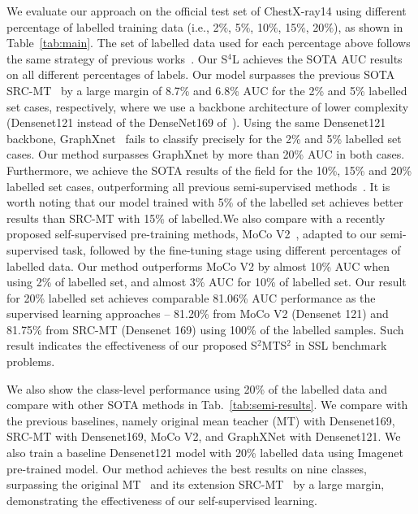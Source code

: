 \documentclass[runningheads]{llncs}
\begin{document}
We evaluate our approach on the official test set of ChestX-ray14
using different percentage of labelled training data (i.e., 2$\%$, 5$\%$, 10$\%$, 15$\%$, 20$\%$), as shown in Table~\ref{tab:main}. The set of labelled data used for each percentage above follows the same strategy of previous works~\cite{aviles2019graphx,liu2020semi}. 
Our S$^4$L achieves the SOTA AUC results on all different percentages of labels. 
Our model surpasses the previous SOTA SRC-MT~\cite{liu2020semi} by a large margin of 8.7\% and 6.8\% AUC  
for the 2\% and 5\% labelled set cases, respectively, where we use a backbone architecture of lower complexity (Densenet121 instead of the DenseNet169 of~\cite{liu2020semi}). Using the same Densenet121 backbone, GraphXnet~\cite{aviles2019graphx} fails to  classify precisely for the 2\% and 5\% labelled set cases. 
Our method surpasses GraphXnet by more than 20\% AUC in both cases. 
Furthermore, we achieve the SOTA results of the field for the 10\%, 15\% and 20\% labelled set cases, outperforming all previous semi-supervised methods~\cite{liu2020semi,aviles2019graphx}. It is worth noting that our model trained with 5\% of the labelled set achieves better results than SRC-MT with 15\% of labelled.We also compare with a recently proposed self-supervised pre-training methods, MoCo V2~\cite{chen2020improved}, adapted to our semi-supervised task,  followed by the fine-tuning stage using different percentages of labelled data.
Our method outperforms MoCo V2 by almost 10\% AUC when using 2\% of labelled set, and almost 3\% AUC for 10\% of labelled set. 
Our result for 20\% labelled set achieves comparable 81.06\% AUC performance as the supervised learning approaches -- 81.20\% from MoCo V2 (Densenet 121) and 81.75\% from SRC-MT (Densenet 169) using 100\% of the labelled samples. Such result indicates the effectiveness of our proposed S$^2$MTS$^2$ in SSL benchmark problems. 

We also show the class-level performance using 20\% of the labelled data and compare with other SOTA methods in Tab.~\ref{tab:semi-results}. We compare with the previous baselines, namely original mean teacher (MT) with Densenet169, SRC-MT with Densenet169, MoCo V2, and GraphXNet with Densenet121. We also train a baseline Densenet121 model with 20\% labelled data using Imagenet pre-trained model. Our method achieves the best results on nine classes, surpassing the original MT~\cite{tarvainen2017mean} and its extension SRC-MT~\cite{liu2020semi} by a large margin, demonstrating the effectiveness of our self-supervised learning. 
\end{document}
